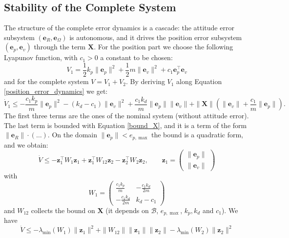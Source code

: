 \documentclass[10pt, a4paper]{report}
\begin{document}
\subsection{Stability of the Complete System}
The structure of the complete error dynamics is a cascade: the attitude error subsystem $(\mathbf e_R,\mathbf e_\Omega)$ is autonomous, and it drives the position error subsystem $(\mathbf e_p,\mathbf e_v)$ through the term $\mathbf X$. For the position part we choose the following Lyapunov function, with $c_1>0$ a constant to be chosen:\begin{equation}
    V_1=\frac{1}{2}k_p\|\mathbf e_p\|^2+\frac{1}{2}m\|\mathbf e_v\|^2+c_1\mathbf e_p^\top\mathbf e_v
\end{equation}
and for the complete system $V=V_1+V_2$. By deriving $V_1$ along Equation \eqref{position_error_dynamics} we get:\begin{equation}
    \dot V_1\le-\frac{c_1k_p}{m}\|\mathbf e_p\|^2-(k_d-c_1)\|\mathbf e_v\|^2+\frac{c_1k_d}{m}\|\mathbf e_p\|\|\mathbf e_v\|+\|\mathbf X\|\left(\|\mathbf e_v\|+\frac{c_1}{m}\|\mathbf e_p\|\right).
\end{equation}
The first three terms are the ones of the nominal system (without attitude error). The last term is bounded with Equation \eqref{bound_X}, and it is a term of the form $\|\mathbf e_R\|\cdot(\dots)$. On the domain $\|\mathbf e_p\|<e_{p,\max}$ the bound is a quadratic form, and we obtain:\begin{equation}
    \dot V\le-\mathbf z_1^\top W_1\mathbf z_1+\mathbf z_1^\top W_{12}\mathbf z_2-\mathbf z_2^\top W_2\mathbf z_2,\quad\quad \mathbf z_1=\begin{pmatrix}
        \|\mathbf e_p\|\\ \|\mathbf e_v\|
    \end{pmatrix}
\end{equation}
with\begin{equation}
    W_1=\begin{pmatrix}
        \frac{c_1k_p}{m}&-\frac{c_1k_d}{2m}\\[1ex]
        -\frac{c_1k_d}{2m}&k_d-c_1
    \end{pmatrix}
\end{equation}
and $W_{12}$ collects the bound on $\mathbf X$ (it depends on $\mathcal B$, $e_{p,\max}$, $k_p,k_d$ and $c_1$). We have\begin{equation}
    \dot V\le-\lambda_{\min}(W_1)\|\mathbf z_1\|^2+\|W_{12}\|\|\mathbf z_1\|\|\mathbf z_2\|-\lambda_{\min}(W_2)\|\mathbf z_2\|^2
\end{equation}
\end{document}
